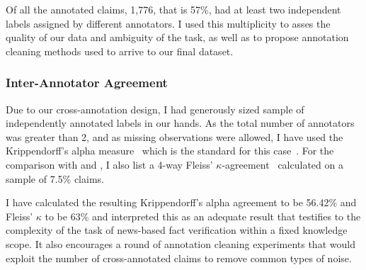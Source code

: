 \begin{table}[H]
    \caption{Label distribution in \CTK splits before and after cleaning. Reprinted from~\cite{lrev}}
    \label{tab:ctkfacts}
    \end{table}

Of all the annotated claims, 1,776, that is 57\%, had at least two independent labels assigned by different annotators.
I used this multiplicity to asses the quality of our data and ambiguity of the task, as well as to propose annotation cleaning methods used to arrive to our final  \CTK dataset.

\subsubsection{Inter-Annotator Agreement}
\label{sec:agreement}

Due to our cross-annotation design, I had generously sized sample of independently annotated labels in our hands.
As the total number of annotators was greater than 2, and as missing observations were allowed, I have used the Krippendorff's alpha measure~\cite{krippendorff1970} which is the standard for this case~\cite{hayes2007krippendorff}.
For the comparison with \cite{fever} and \cite{norregaard2021danfever}, I also list a 4-way Fleiss' $\kappa$-agreement~\cite{fleiss1971measuring} calculated on a sample of 7.5\% claims.

I have calculated the resulting Krippendorff's alpha agreement to be 56.42\% and Fleiss' $\kappa$ to be 63\% and interpreted this as an adequate result that testifies to the complexity of the task of news-based fact verification within a fixed knowledge scope.
It also encourages a round of annotation cleaning experiments that would exploit the number of cross-annotated claims to remove common types of noise.

